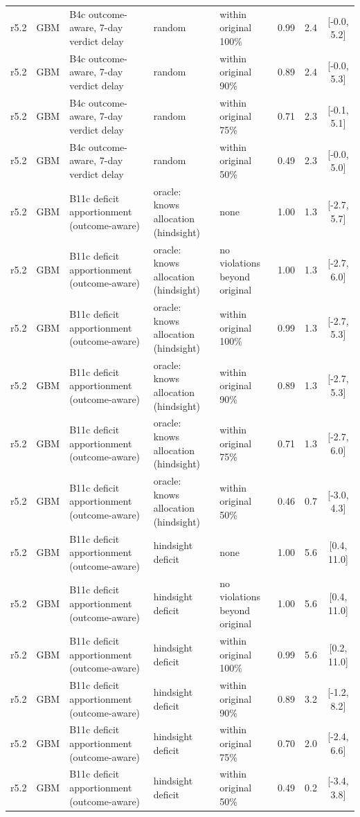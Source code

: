 \documentclass[10pt,onecolumn,letterpaper]{article}
\begin{document}
\begin{longtable}{lllp{4.2cm}p{3.4cm}ccc}
r5.2 & GBM & B4c outcome-aware, 7-day verdict delay & random & within original 100\% & 0.99 & 2.4 & [-0.0, 5.2] \\
r5.2 & GBM & B4c outcome-aware, 7-day verdict delay & random & within original 90\% & 0.89 & 2.4 & [-0.0, 5.3] \\
r5.2 & GBM & B4c outcome-aware, 7-day verdict delay & random & within original 75\% & 0.71 & 2.3 & [-0.1, 5.1] \\
r5.2 & GBM & B4c outcome-aware, 7-day verdict delay & random & within original 50\% & 0.49 & 2.3 & [-0.0, 5.0] \\
r5.2 & GBM & B11c deficit apportionment (outcome-aware) & oracle: knows allocation (hindsight) & none & 1.00 & 1.3 & [-2.7, 5.7] \\
r5.2 & GBM & B11c deficit apportionment (outcome-aware) & oracle: knows allocation (hindsight) & no violations beyond original & 1.00 & 1.3 & [-2.7, 6.0] \\
r5.2 & GBM & B11c deficit apportionment (outcome-aware) & oracle: knows allocation (hindsight) & within original 100\% & 0.99 & 1.3 & [-2.7, 5.3] \\
r5.2 & GBM & B11c deficit apportionment (outcome-aware) & oracle: knows allocation (hindsight) & within original 90\% & 0.89 & 1.3 & [-2.7, 5.3] \\
r5.2 & GBM & B11c deficit apportionment (outcome-aware) & oracle: knows allocation (hindsight) & within original 75\% & 0.71 & 1.3 & [-2.7, 6.0] \\
r5.2 & GBM & B11c deficit apportionment (outcome-aware) & oracle: knows allocation (hindsight) & within original 50\% & 0.46 & 0.7 & [-3.0, 4.3] \\
r5.2 & GBM & B11c deficit apportionment (outcome-aware) & hindsight deficit & none & 1.00 & 5.6 & [0.4, 11.0] \\
r5.2 & GBM & B11c deficit apportionment (outcome-aware) & hindsight deficit & no violations beyond original & 1.00 & 5.6 & [0.4, 11.0] \\
r5.2 & GBM & B11c deficit apportionment (outcome-aware) & hindsight deficit & within original 100\% & 0.99 & 5.6 & [0.2, 11.0] \\
r5.2 & GBM & B11c deficit apportionment (outcome-aware) & hindsight deficit & within original 90\% & 0.89 & 3.2 & [-1.2, 8.2] \\
r5.2 & GBM & B11c deficit apportionment (outcome-aware) & hindsight deficit & within original 75\% & 0.70 & 2.0 & [-2.4, 6.6] \\
r5.2 & GBM & B11c deficit apportionment (outcome-aware) & hindsight deficit & within original 50\% & 0.49 & 0.2 & [-3.4, 3.8] \\

\end{longtable}
\end{document}
